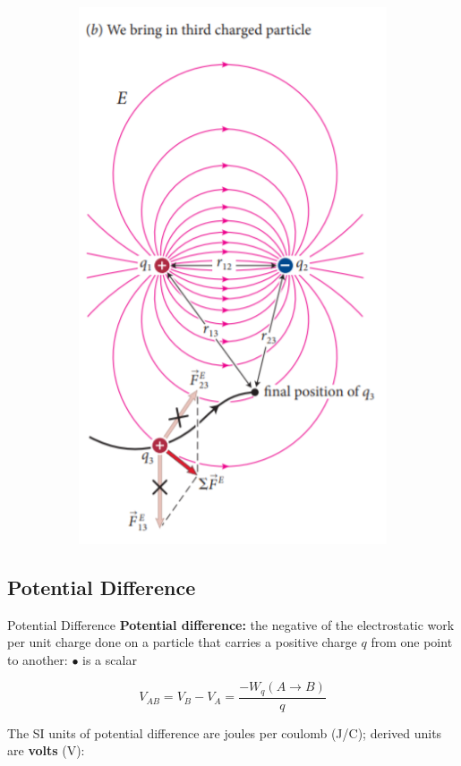 \begin{figure}[hbt!]
\begin{subfigure}[b]{.45\textwidth}
                \includegraphics[scale = 0.70]{Resources/25.4_Multiple_Particles_2}
            \end{subfigure}
        \end{figure}

    \subsection{Potential Difference}       %

        \begin{theorem}{Potential Difference}
            \textbf{Potential difference:} the negative of the electrostatic work per unit charge done on a particle that carries a positive charge $q$ from one point to another:
            $\bullet$ is a scalar

            \[
                V_{AB} = V_B - V_A = \frac{-W_q (A\to B)}{q}
            \]
        \end{theorem}

        The SI units of potential difference are joules per coulomb (J/C); derived units are \textbf{volts} (V):

